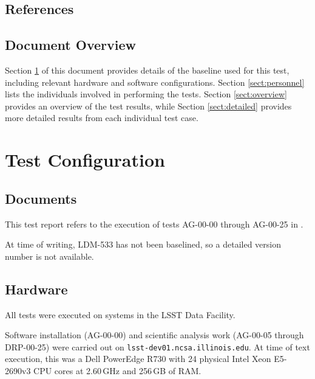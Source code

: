\documentclass[DM,lsstdraft,STR,toc]{lsstdoc}
\begin{document}
\subsection{References}
\label{sect:references}

\renewcommand{\refname}{}


\subsection{Document Overview}
\label{sect:docoverview}

Section \ref{sect:configuration} of this document provides details of the \product{} baseline used for this test, including relevant hardware and software configurations.
Section \ref{sect:personnel} lists the individuals involved in performing the tests.
Section \ref{sect:overview} provides an overview of the test results, while Section \ref{sect:detailed} provides more detailed results from each individual test case.

\section{Test Configuration}
\label{sect:configuration}

\subsection{Documents}

This test report refers to the execution of tests AG-00-00 through AG-00-25 in .

\begin{note}
At time of writing, LDM-533 has not been baselined, so a detailed version
number is not available.
\end{note}

\subsection{Hardware}
\label{sect:hwconf}

All tests were executed on systems in the LSST Data Facility.

Software installation (AG-00-00) and scientific analysis work (AG-00-05 through DRP-00-25) were carried out on \texttt{lsst-dev01.ncsa.illinois.edu}.
At time of text execution, this was a Dell PowerEdge R730 with 24 physical Intel Xeon E5-2690v3 CPU cores at 2.60\,GHz and 256\,GB of RAM.
\end{document}
